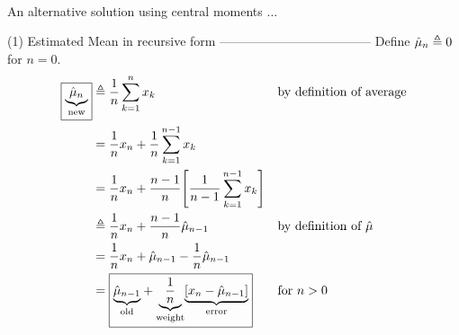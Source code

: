 $\newcommand{\ds}{\displaystyle}$
$\newcommand{\mean}{\mu}$
$\newcommand{\popvar}{\sigma^2}$
$\newcommand{\cmom}{\mu}$
$\newcommand{\meanest}{\hat{\mean}}$
$\newcommand{\seqn}[1]{\left\{#1\right\}}$
$\newcommand{\rvx}{x}$
$\newcommand{\xN}{N}$
$\newcommand{\eqd}{\triangleq}$
$\newcommand{\brp}[1]{{\left(#1\right)}}$
$\newcommand{\brs}[1]{{\left[#1\right]}}$
$\newcommand{\brl}[1]{{\left.#1\right|}}$
$\newcommand{\moment}{M}$
$\newcommand{\momest}{\hat{\moment}}$
$\newcommand{\meanest}{\hat{\mean}}$
$\newcommand{\cmomest}{\hat{\cmom}}$
$\newcommand{\varest}{\hat{\var}}$
$\newcommand{\popvarest}{\hat{\popvar}}$
$\newcommand{\mcom}[2]{{\displaystyle\underbrace{\displaystyle#1}_{\text{#2}}}}$
$\newcommand{\indentx}{\ensuremath{\mbox{}\qquad}}$
$\newcommand{\bcoef}[2]{{#1\choose#2}}$

An alternative solution using central moments $\ldots$

(1) Estimated Mean in recursive form
------------------------------------
Define $\meanest_{n}\eqd 0$ for $n=0$.
\begin{align*}
  \boxed{\mcom{\meanest_{n}}{new}}
    &\eqd \frac{1}{n} \sum_{k=1}^{n} \rvx_k
    && \text{by definition of average}
  \\&= \frac{1}{n}\rvx_n + \frac{1}{n} \sum_{k=1}^{n-1} \rvx_k
  \\&= \frac{1}{n}\rvx_n + \frac{n-1}{n}\brs{\frac{1}{n-1} \sum_{k=1}^{n-1} \rvx_k }
  \\&\eqd \frac{1}{n}\rvx_n + \frac{n-1}{n}\meanest_{n-1}
    && \text{by definition of $\meanest$}
  \\&= \frac{1}{n}\rvx_n + \meanest_{n-1} - \frac{1}{n}\meanest_{n-1}
  \\&= \boxed{\mcom{\meanest_{n-1}}{old} + \mcom{\frac{1}{n}}{weight} \mcom{\brs{\rvx_n - \meanest_{n-1}}}{error}}
    && \text{for $n>0$}
\end{align*}

